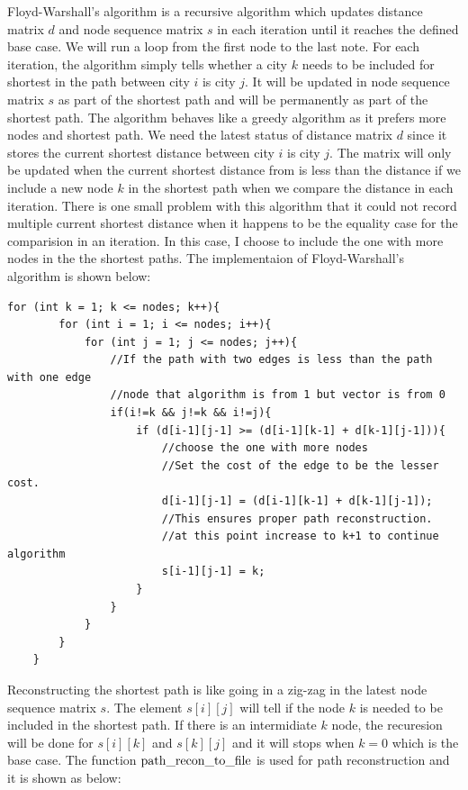\documentclass[a4paper,12pt]{article}%
\begin{document}
Floyd-Warshall's algorithm is a recursive algorithm which updates distance matrix $d$ and 
node sequence matrix $s$ in each iteration until it reaches the defined base case. We will run a loop from the first node to the last note. For each iteration, the algorithm simply tells whether a city $k$ needs to be included for shortest in the path between city $i$ is city $j$. It will be updated in node sequence matrix $s$ as part of the shortest path and will be permanently as part of the shortest path. The algorithm behaves like a greedy algorithm as it prefers more nodes and shortest path. We need the latest status of distance matrix $d$ since it stores the current shortest distance between city $i$ is city $j$. The matrix will only be updated when the current shortest distance from is less than the distance if we include a new node $k$ in the shortest path when we compare the distance in each iteration. There is one small problem with this algorithm that it could not record multiple current shortest distance when it happens to be the equality case for the comparision in an iteration. In this case, I choose to include the one with more nodes in the the shortest paths. The implementaion of Floyd-Warshall’s algorithm is shown below:
\begin{lstlisting}[title = $\lstinline{WFI}$]
	for (int k = 1; k <= nodes; k++){
        for (int i = 1; i <= nodes; i++){
            for (int j = 1; j <= nodes; j++){
                //If the path with two edges is less than the path with one edge
                //node that algorithm is from 1 but vector is from 0
                if(i!=k && j!=k && i!=j){ 
                    if (d[i-1][j-1] >= (d[i-1][k-1] + d[k-1][j-1])){
                        //choose the one with more nodes
                        //Set the cost of the edge to be the lesser cost.
                        d[i-1][j-1] = (d[i-1][k-1] + d[k-1][j-1]);
                        //This ensures proper path reconstruction. 
                        //at this point increase to k+1 to continue algorithm
                        s[i-1][j-1] = k;
                    }
                }
            }  	  
		}
    }        
\end{lstlisting}
Reconstructing the shortest path is like going in a zig-zag in the latest node sequence matrix $s$. The element $s[i][j]$ will tell if the node $k$ is needed to be included in the shortest path. If there is an intermidiate $k$ node, the recuresion will be done for $s[i][k]$ and $s[k][j]$ and it will stops when $k=0$ which is the base case. The function $\lstinline{path_recon_to_file}$ is used for path reconstruction and it is shown as below:
\end{document}
